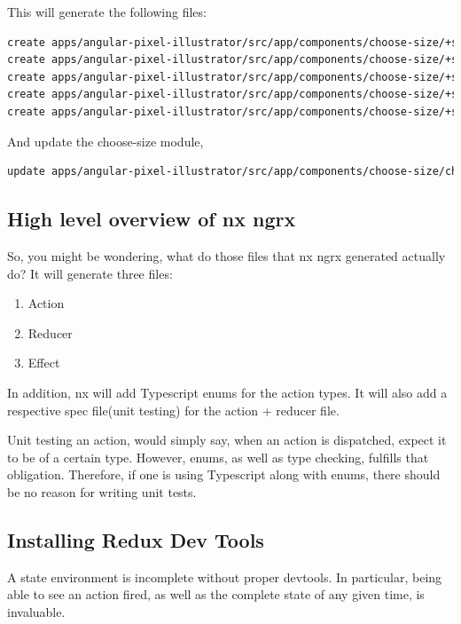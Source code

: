 This will generate the following files:
\begin{lstlisting}[language=Bash]
create apps/angular-pixel-illustrator/src/app/components/choose-size/+state/choose-size.actions.ts (684 bytes)
create apps/angular-pixel-illustrator/src/app/components/choose-size/+state/choose-size.reducer.ts (869 bytes)
create apps/angular-pixel-illustrator/src/app/components/choose-size/+state/choose-size.effects.ts (859 bytes)
create apps/angular-pixel-illustrator/src/app/components/choose-size/+state/choose-size.effects.spec.ts (1070 bytes)
create apps/angular-pixel-illustrator/src/app/components/choose-size/+state/choose-size.reducer.spec.ts (364 bytes)
\end{lstlisting}
And update the choose-size module,
\begin{lstlisting}[language=Bash]
update apps/angular-pixel-illustrator/src/app/components/choose-size/choose-size.module.ts
\end{lstlisting}

\subsection{ High level overview of nx ngrx }
So, you might be wondering, what do those files that nx ngrx generated actually
do? It will generate three files:
\begin{enumerate}
  \item Action
  \item Reducer
  \item Effect
\end{enumerate}

In addition, nx will add Typescript enums for the action types. It will also
add a respective spec file(unit testing) for the action + reducer file.

\colorbox{darkgray}{\color{white}{Unit testing Actions?}}

Unit testing an action, would simply say, when an action is dispatched, expect
it to be of a certain type. However, enums, as well as type checking, fulfills
that obligation. Therefore, if one is using Typescript along with enums, there
should be no reason for writing unit tests.

\subsection{ Installing Redux Dev Tools }
A state environment is incomplete without proper devtools. In particular, being
able to see an action fired, as well as the complete state of any given time,
is invaluable.

